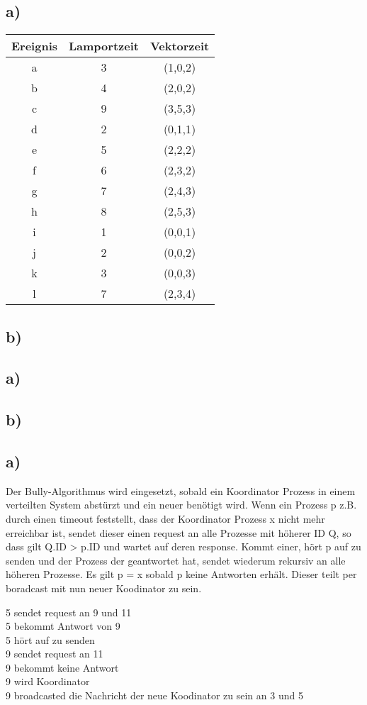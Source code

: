 \documentclass[ngerman]{fbi-aufgabenblatt}
\begin{document}
	\setcounter{section}{0}

	
	\subsection*{a)}
	\begin{tabular}{c|c|c}
		Ereignis & Lamportzeit & Vektorzeit \\
		\hline
		a & 3 & (1,0,2)\\
		b & 4 & (2,0,2) \\
		c & 9 & (3,5,3) \\
		
		d & 2 & (0,1,1) \\
		e & 5 & (2,2,2) \\
		f & 6 & (2,3,2) \\
		g & 7 & (2,4,3) \\
		h & 8 & (2,5,3) \\
		
		i & 1 & (0,0,1) \\
		j & 2 & (0,0,2) \\
		k & 3 & (0,0,3) \\
		l & 7 & (2,3,4) \\
	\end{tabular}

	\subsection*{b)}
	
    
	
	\subsection*{a)}

	\subsection*{b)}	
	
	\subsection*{a)}
	Der Bully-Algorithmus wird eingesetzt, sobald ein Koordinator Prozess in einem verteilten System abstürzt und ein neuer benötigt wird.
	Wenn ein Prozess p z.B. durch einen timeout feststellt, dass der Koordinator Prozess x nicht mehr erreichbar ist, sendet dieser einen request an alle Prozesse mit höherer ID Q, so dass gilt Q.ID > p.ID und wartet auf deren response. Kommt einer, hört p auf zu senden und der Prozess der geantwortet hat, sendet wiederum rekursiv an alle höheren Prozesse. Es gilt p = x sobald p keine Antworten erhält. Dieser teilt per boradcast mit nun neuer Koodinator zu sein.

	5 sendet request an 9 und 11\\
	5 bekommt Antwort von 9\\
	5 hört auf zu senden\\
	9 sendet request an 11\\
	9 bekommt keine Antwort\\
	9 wird Koordinator\\
	9 broadcasted die Nachricht der neue Koodinator zu sein an 3 und 5 	
		
	
\end{document}
